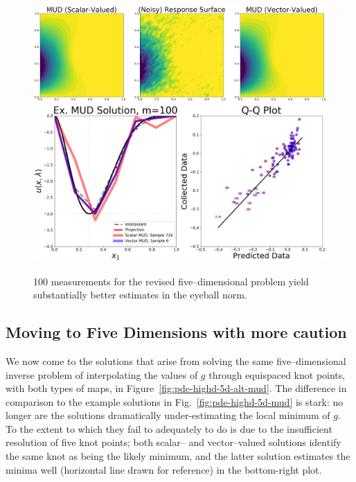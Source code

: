 \begin{figure}[htbp]
\centering
  \includegraphics[width=0.95\linewidth]{figures/pde-highd/pde-highd_surf_exmud_D5-alt_m100.png}
  \includegraphics[width=0.9\linewidth]{figures/pde-highd/pde-highd-alt_comp_exmud_D5_m100.png}
\caption{
100 measurements for the revised five--dimensional problem yield substantially better estimates in the eyeball norm.
}
\label{fig:pde-highd-5d-alt-example}
\end{figure}


\subsection{Moving to Five Dimensions with more caution}

We now come to the solutions that arise from solving the same five--dimensional inverse problem of interpolating the values of $g$ through equispaced knot points, with both types of maps, in Figure~\ref{fig:pde-highd-5d-alt-mud}.
The difference in comparison to the example solutions in Fig.~\ref{fig:pde-highd-5d-mud} is stark: no longer are the solutions dramatically under-estimating the local minimum of $g$.
To the extent to which they fail to adequately to do is due to the insufficient resolution of five knot points; both scalar-- and vector--valued solutions identify the same knot as being the likely minimum, and the latter solution estimates the minima well (horizontal line drawn for reference) in the bottom-right plot.

